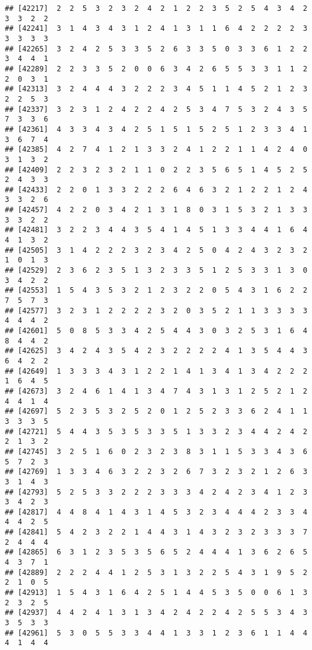 \documentclass[
]{article}
\begin{document}
\begin{verbatim}
## [42217]  2  2  5  3  2  3  2  4  2  1  2  2  3  5  2  5  4  3  4  2  3  3  2  2
## [42241]  3  1  4  3  4  3  1  2  4  1  3  1  1  6  4  2  2  2  2  3  3  3  3  3
## [42265]  3  2  4  2  5  3  3  5  2  6  3  3  5  0  3  3  6  1  2  2  3  4  4  1
## [42289]  2  2  3  3  5  2  0  0  6  3  4  2  6  5  5  3  3  1  1  2  2  0  3  1
## [42313]  3  2  4  4  4  3  2  2  2  3  4  5  1  1  4  5  2  1  2  3  2  2  5  3
## [42337]  3  2  3  1  2  4  2  2  4  2  5  3  4  7  5  3  2  4  3  5  7  3  3  6
## [42361]  4  3  3  4  3  4  2  5  1  5  1  5  2  5  1  2  3  3  4  1  3  6  7  4
## [42385]  4  2  7  4  1  2  1  3  3  2  4  1  2  2  1  1  4  2  4  0  3  1  3  2
## [42409]  2  2  3  2  3  2  1  1  0  2  2  3  5  6  5  1  4  5  2  5  2  4  3  3
## [42433]  2  2  0  1  3  3  2  2  2  6  4  6  3  2  1  2  2  1  2  4  3  3  2  6
## [42457]  4  2  2  0  3  4  2  1  3  1  8  0  3  1  5  3  2  1  3  3  3  3  2  2
## [42481]  3  2  2  3  4  4  3  5  4  1  4  5  1  3  3  4  4  1  6  4  4  1  3  2
## [42505]  3  1  4  2  2  2  3  2  3  4  2  5  0  4  2  4  3  2  3  2  1  0  1  3
## [42529]  2  3  6  2  3  5  1  3  2  3  3  5  1  2  5  3  3  1  3  0  3  4  2  2
## [42553]  1  5  4  3  5  3  2  1  2  3  2  2  0  5  4  3  1  6  2  2  7  5  7  3
## [42577]  3  2  3  1  2  2  2  2  3  2  0  3  5  2  1  1  3  3  3  3  4  4  4  2
## [42601]  5  0  8  5  3  3  4  2  5  4  4  3  0  3  2  5  3  1  6  4  8  4  4  2
## [42625]  3  4  2  4  3  5  4  2  3  2  2  2  2  4  1  3  5  4  4  3  6  4  2  2
## [42649]  1  3  3  3  4  3  1  2  2  1  4  1  3  4  1  3  4  2  2  2  1  6  4  5
## [42673]  3  2  4  6  1  4  1  3  4  7  4  3  1  3  1  2  5  2  1  2  4  4  1  4
## [42697]  5  2  3  5  3  2  5  2  0  1  2  5  2  3  3  6  2  4  1  1  3  3  3  5
## [42721]  5  4  4  3  5  3  5  3  3  5  1  3  3  2  3  4  4  2  4  2  2  1  3  2
## [42745]  3  2  5  1  6  0  2  3  2  3  8  3  1  1  5  3  3  4  3  6  5  7  2  3
## [42769]  1  3  3  4  6  3  2  2  3  2  6  7  3  2  3  2  1  2  6  3  3  1  4  3
## [42793]  5  2  5  3  3  2  2  2  3  3  3  4  2  4  2  3  4  1  2  3  3  4  2  3
## [42817]  4  4  8  4  1  4  3  1  4  5  3  2  3  4  4  4  2  3  3  4  4  4  2  5
## [42841]  5  4  2  3  2  2  1  4  4  3  1  4  3  2  3  2  3  3  3  7  2  4  4  4
## [42865]  6  3  1  2  3  5  3  5  6  5  2  4  4  4  1  3  6  2  6  5  4  3  7  1
## [42889]  2  2  2  4  4  1  2  5  3  1  3  2  2  5  4  3  1  9  5  2  2  1  0  5
## [42913]  1  5  4  3  1  6  4  2  5  1  4  4  5  3  5  0  0  6  1  3  2  3  2  5
## [42937]  4  4  2  4  1  3  1  3  4  2  4  2  2  4  2  5  5  3  4  3  3  5  3  3
## [42961]  5  3  0  5  5  3  3  4  4  1  3  3  1  2  3  6  1  1  4  4  4  1  4  4

\end{verbatim}
\end{document}
